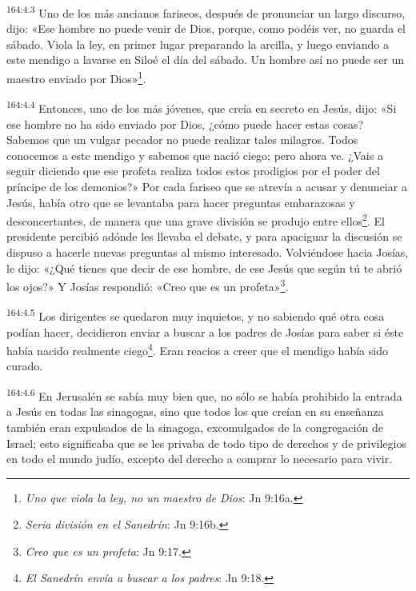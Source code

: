 \par 
\textsuperscript{164:4.3} Uno de los más ancianos fariseos, después de pronunciar un largo discurso, dijo: «Ese hombre no puede venir de Dios, porque, como podéis ver, no guarda el sábado. Viola la ley, en primer lugar preparando la arcilla, y luego enviando a este mendigo a lavarse en Siloé el día del sábado. Un hombre así no puede ser un maestro enviado por Dios»\footnote{\textit{Uno que viola la ley, no un maestro de Dios}: Jn 9:16a.}.

\par 
\textsuperscript{164:4.4} Entonces, uno de los más jóvenes, que creía en secreto en Jesús, dijo: «Si ese hombre no ha sido enviado por Dios, ¿cómo puede hacer estas cosas? Sabemos que un vulgar pecador no puede realizar tales milagros. Todos conocemos a este mendigo y sabemos que nació ciego; pero ahora ve. ¿Vais a seguir diciendo que ese profeta realiza todos estos prodigios por el poder del príncipe de los demonios?» Por cada fariseo que se atrevía a acusar y denunciar a Jesús, había otro que se levantaba para hacer preguntas embarazosas y desconcertantes, de manera que una grave división se produjo entre ellos\footnote{\textit{Seria división en el Sanedrín}: Jn 9:16b.}. El presidente percibió adónde les llevaba el debate, y para apaciguar la discusión se dispuso a hacerle nuevas preguntas al mismo interesado. Volviéndose hacia Josías, le dijo: «¿Qué tienes que decir de ese hombre, de ese Jesús que según tú te abrió los ojos?» Y Josías respondió: «Creo que es un profeta»\footnote{\textit{Creo que es un profeta}: Jn 9:17.}.

\par 
\textsuperscript{164:4.5} Los dirigentes se quedaron muy inquietos, y no sabiendo qué otra cosa podían hacer, decidieron enviar a buscar a los padres de Josías para saber si éste había nacido realmente ciego\footnote{\textit{El Sanedrín envía a buscar a los padres}: Jn 9:18.}. Eran reacios a creer que el mendigo había sido curado.

\par 
\textsuperscript{164:4.6} En Jerusalén se sabía muy bien que, no sólo se había prohibido la entrada a Jesús en todas las sinagogas, sino que todos los que creían en su enseñanza también eran expulsados de la sinagoga, excomulgados de la congregación de Israel; esto significaba que se les privaba de todo tipo de derechos y de privilegios en todo el mundo judío, excepto del derecho a comprar lo necesario para vivir.

